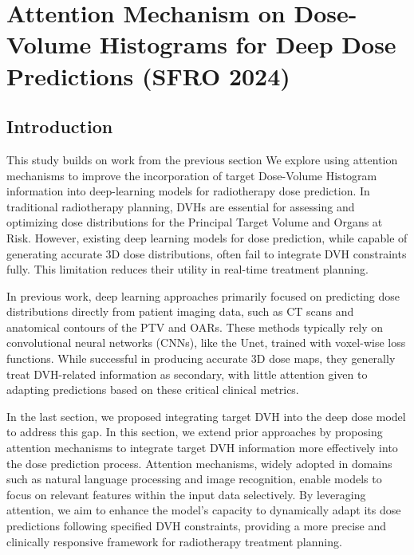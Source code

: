 


\section{Attention Mechanism on Dose-Volume Histograms for Deep Dose Predictions (SFRO 2024)}
\subsection{Introduction}
This study builds on work from the previous section
We explore using attention mechanisms to improve the incorporation of target Dose-Volume Histogram information into deep-learning models for radiotherapy dose prediction.
In traditional radiotherapy planning, DVHs are essential for assessing and optimizing dose distributions for the Principal Target Volume and Organs at Risk.
However, existing deep learning models for dose prediction, while capable of generating accurate 3D dose distributions, often fail to integrate DVH constraints fully.
This limitation reduces their utility in real-time treatment planning.

In previous work, deep learning approaches primarily focused on predicting dose distributions directly from patient imaging data, such as CT scans and anatomical contours of the PTV and OARs.
These methods typically rely on convolutional neural networks (CNNs), like the Unet, trained with voxel-wise loss functions.
While successful in producing accurate 3D dose maps, they generally treat DVH-related information as secondary, with little attention given to adapting predictions based on these critical clinical metrics.

In the last section, we proposed integrating target DVH into the deep dose model to address this gap.
In this section, we extend prior approaches by proposing attention mechanisms to integrate target DVH information more effectively into the dose prediction process.
Attention mechanisms, widely adopted in domains such as natural language processing and image recognition, enable models to focus on relevant features within the input data selectively.
By leveraging attention, we aim to enhance the model's capacity to dynamically adapt its dose predictions following specified DVH constraints, providing a more precise and clinically responsive framework for radiotherapy treatment planning.

